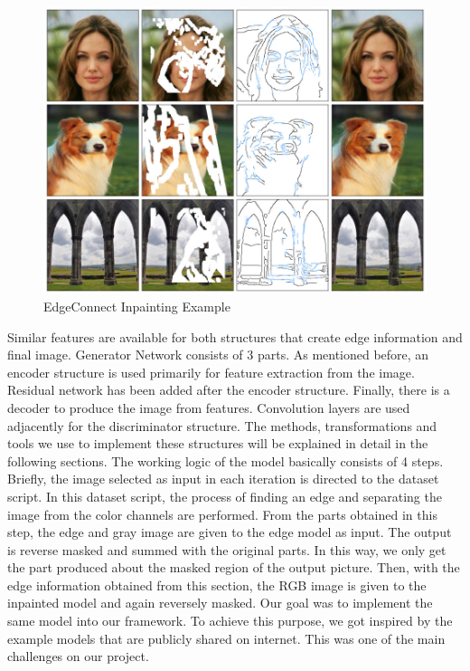 \begin{figure}[h!]
    \centering
    \includegraphics[scale=0.85]{figures/chapter4/ExampleEdgeConnect.PNG}
    \vspace*{5mm}
    \caption{EdgeConnect Inpainting Example \cite{edgeconnect}}
    \label{fig:edgeconnect-example}
\end{figure}

Similar features are available for both structures that create edge information and final image. Generator Network consists of 3 parts. As mentioned before, an encoder structure is used primarily for feature extraction from the image. Residual network has been added after the encoder structure. Finally, there is a decoder to produce the image from features. Convolution layers are used adjacently for the discriminator structure.
The methods, transformations and tools we use to implement these structures will be explained in detail in the following sections.\newline
The working logic of the model basically consists of 4 steps. Briefly, the image selected as input in each iteration is directed to the dataset script. In this dataset script, the process of finding an edge and separating the image from the color channels are performed. From the parts obtained in this step, the edge and gray image are given to the edge model as input. The output is reverse masked and summed with the original parts. In this way, we only get the part produced about the masked region of the output picture. Then, with the edge information obtained from this section, the RGB image is given to the inpainted model and again reversely masked. \newline
Our goal was to implement the same model into our framework. To achieve this purpose, we got inspired by the example models that are publicly shared on internet. This was one of the main challenges on our project.  


